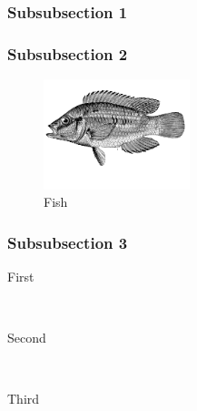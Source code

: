 \documentclass[12pt, spanish]{article} %
\begin{document}
\subsubsection{Subsubsection 1} %

\lipsum[6] %


\subsubsection{Subsubsection 2} %

\lipsum[6] %
\begin{figure} %
  \begin{center}
    \includegraphics[width=0.38\textwidth]{fish}
  \end{center}
  \caption{Fish}
\end{figure}
\lipsum[7-8] %


\subsubsection{Subsubsection 3} %

\begin{description} %

\item[First] \hfill \\
\lipsum[9] %

\item[Second] \hfill \\
\lipsum[10] %

\item[Third] \hfill \\
\lipsum[11] %

\end{description} 

\end{document}
